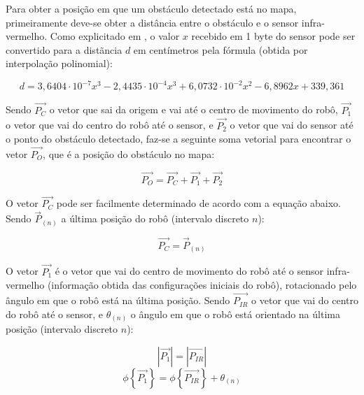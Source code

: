 Para obter a posição em que um obstáculo detectado está no mapa, primeiramente deve-se obter a distância entre o obstáculo e o sensor infra-vermelho. Como explicitado em \cite{bellator_2012}, o valor $x$ recebido em 1 byte do sensor pode ser convertido para a distãncia $d$ em centímetros pela fórmula (obtida por interpolação polinomial):

\begin{equation}
  d = 3,6404 \cdot 10^{-7} x^3 - 2,4435 \cdot 10^{-4} x^3 + 6,0732 \cdot 10^{-2} x^2 - 6,8962 x + 339,361
  \label{eq:IR_dist}
\end{equation}


Sendo $\overrightarrow{P_C}$ o vetor que sai da origem e vai até o centro de movimento do robô, $\overrightarrow{P_1}$ o vetor que vai do centro do robô até o sensor, e $\overrightarrow{P_2}$ o vetor que vai do sensor até o ponto do obstáculo detectado, faz-se a seguinte soma vetorial para encontrar o vetor $\overrightarrow{P_O}$, que é a posição do obstáculo no mapa:

\begin{equation}
  \overrightarrow{P_O} = \overrightarrow{P_C} + \overrightarrow{P_1} + \overrightarrow{P_2}
  \label{eq:IR_vector}
\end{equation}


O vetor $\overrightarrow{P_C}$ pode ser facilmente determinado de acordo com a equação abaixo. Sendo $\overrightarrow{P}_{(n)}$ a última posição do robô (intervalo discreto $n$):

\begin{equation}
  \overrightarrow{P_C} = \overrightarrow{P}_{(n)}
  \label{eq:IR-P_C}
\end{equation}

O vetor $\overrightarrow{P_1}$ é o vetor que vai do centro de movimento do robô até o sensor infra-vermelho (informação obtida das configurações iniciais do robô), rotacionado pelo ângulo em que o robô está na última posição. Sendo $\overrightarrow{P_{IR}}$ o vetor que vai do centro do robô até o sensor, e $\theta_{(n)}$ o ângulo em que o robô está orientado na última posição (intervalo discreto $n$):


\begin{equation}
  |\overrightarrow{P_1}| = |\overrightarrow{P_{IR}}|
  \label{eq:IR-P_1_modulo}
\end{equation}
\begin{equation}
  \phi \left\{ \overrightarrow{P_1} \right\} = \phi \left\{ \overrightarrow{P_{IR}} \right\} + \theta_{(n)}
  \label{eq:IR-P_1_fase}
\end{equation}


